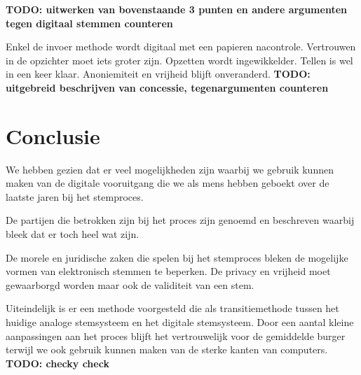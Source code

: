 \documentclass[a4paper]{article}
\newcommand{\TODO}[1]{{\color{red}\textbf{TODO: #1}}}
\begin{document}
\TODO{uitwerken van bovenstaande 3 punten en andere argumenten tegen digitaal stemmen counteren}

\noindent
Enkel de invoer methode wordt digitaal met een papieren nacontrole. Vertrouwen in de opzichter moet iets groter zijn. Opzetten wordt ingewikkelder. Tellen is wel in een keer klaar. Anoniemiteit en vrijheid blijft onveranderd. 
\TODO{uitgebreid beschrijven van concessie, tegenargumenten counteren}

\newpage

\section{Conclusie}
We hebben gezien dat er veel mogelijkheden zijn waarbij we gebruik kunnen maken van de digitale vooruitgang die we als mens hebben geboekt over de laatste jaren bij het stemproces. 

De partijen die betrokken zijn bij het proces zijn genoemd en beschreven waarbij bleek dat er toch heel wat zijn. 

De morele en juridische zaken die spelen bij het stemproces bleken de mogelijke vormen van elektronisch stemmen te beperken. De privacy en vrijheid moet gewaarborgd worden maar ook de validiteit van een stem. 

Uiteindelijk is er een methode voorgesteld die als transitiemethode tussen het huidige analoge stemsysteem en het digitale stemsysteem. Door een aantal kleine aanpassingen aan het proces blijft het vertrouwelijk voor de gemiddelde burger terwijl we ook gebruik kunnen maken van de sterke kanten van computers. 
\TODO{checky check}


\renewcommand\refname{Literatuur}

\end{document}
